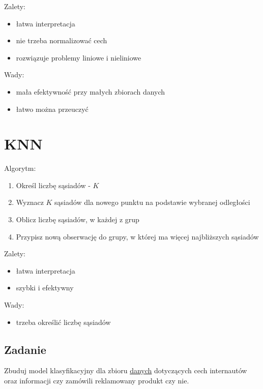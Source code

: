 \documentclass[]{book}
\providecommand{\tightlist}{%
  \setlength{\itemsep}{0pt}\setlength{\parskip}{0pt}}
\begin{document}
Zalety:

\begin{itemize}
\tightlist
\item
  łatwa interpretacja
\item
  nie trzeba normalizować cech
\item
  rozwiązuje problemy liniowe i nieliniowe
\end{itemize}

Wady:

\begin{itemize}
\tightlist
\item
  mała efektywność przy małych zbiorach danych
\item
  łatwo można przeuczyć
\end{itemize}

\section{KNN}\label{knn}

Algorytm:

\begin{enumerate}
\def\labelenumi{\arabic{enumi}.}
\tightlist
\item
  Określ liczbę sąsiadów - \(K\)
\item
  Wyznacz \(K\) sąsiadów dla nowego punktu na podstawie wybranej
  odległości
\item
  Oblicz liczbę sąsiadów, w każdej z grup
\item
  Przypisz nową obserwację do grupy, w której ma więcej najbliższych
  sąsiadów
\end{enumerate}

Zalety:

\begin{itemize}
\tightlist
\item
  łatwa interpretacja
\item
  szybki i efektywny
\end{itemize}

Wady:

\begin{itemize}
\tightlist
\item
  trzeba określić liczbę sąsiadów
\end{itemize}

\subsection{Zadanie}\label{zadanie-2}

Zbuduj model klasyfikacyjny dla zbioru
\href{data/Social_Network_Ads.csv}{danych} dotyczących cech internautów
oraz informacji czy zamówili reklamowany produkt czy nie.
\end{document}
